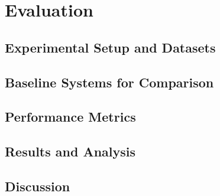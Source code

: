 \chapter{Evaluation}


\section{Experimental Setup and Datasets}
\section{Baseline Systems for Comparison}
\section{Performance Metrics}
\section{Results and Analysis}
\section{Discussion}